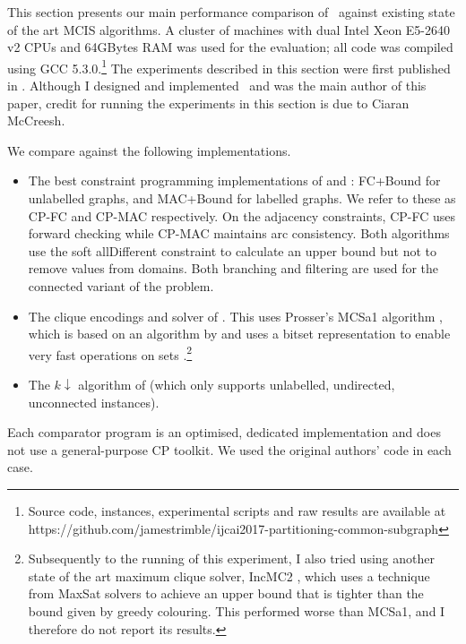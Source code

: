 This section presents our main performance comparison of \McSplit\ against
existing state of the art MCIS algorithms.
A cluster of machines with dual Intel Xeon E5-2640 v2 CPUs and
64GBytes RAM was used for the evaluation; all code was compiled
using GCC 5.3.0.\footnote{Source code, instances, experimental scripts and raw
results are available at
https://github.com/jamestrimble/ijcai2017-partitioning-common-subgraph}
The experiments described in this section were first published in
\citet{DBLP:conf/ijcai/McCreeshPT17}.  Although I designed and implemented
\McSplit\ and was the main author of this paper, credit for running
the experiments in this section is due to Ciaran McCreesh.

We compare against the following implementations.

\begin{itemize}
\item The best constraint
programming implementations of \citet{DBLP:conf/cp/NdiayeS11} and
\citet{DBLP:conf/cp/McCreeshNPS16}:
FC+Bound for unlabelled graphs,
and MAC+Bound for labelled graphs.  We refer to these as CP-FC and
CP-MAC respectively.  On the adjacency constraints, CP-FC uses forward checking
while CP-MAC maintains arc consistency.
Both algorithms use the soft allDifferent constraint to calculate
an upper bound but not to remove values from domains.
Both branching and filtering are used for the connected variant of
the problem.
\item The clique encodings and solver of \citet{DBLP:conf/cp/McCreeshNPS16}.
This uses Prosser's MCSa1 algorithm \citep{DBLP:journals/algorithms/Prosser12}, which is
based on an algorithm by \citet{DBLP:journals/ieicet/TomitaSHW13} and uses a
bitset representation to enable very fast operations on sets
\citep{DBLP:journals/cor/SegundoRJ11}.\footnote{
Subsequently to the running of this experiment,
I also tried using another state of the
art maximum clique solver, IncMC2 \citep{DBLP:journals/informs/LiFJX18}, which
uses a technique from MaxSat solvers to achieve an upper bound that is tighter
than the bound given by greedy colouring.
This performed worse than MCSa1, and I therefore do not report its
results.}
\item The
$k{\downarrow}$ algorithm of \citet{UpcomingAAAIPaper} (which only supports
unlabelled, undirected, unconnected instances).
\end{itemize}

Each comparator
program is an optimised, dedicated implementation and does not use a
general-purpose CP toolkit.  We used the original authors'
code in each case.







